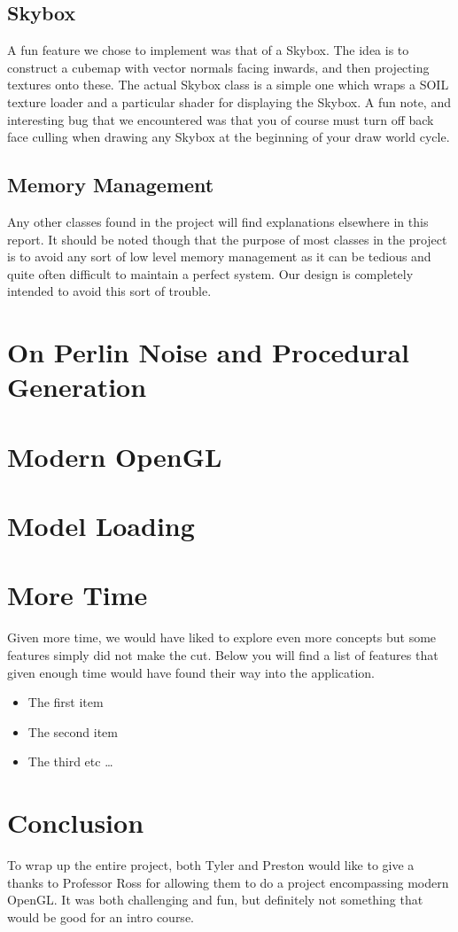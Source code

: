 \documentclass[paper=a4, fontsize=11pt]{scrartcl}
\numberwithin{equation}{section}		%
\numberwithin{figure}{section}			%
\numberwithin{table}{section}				%
\begin{document}
\subsection{Skybox}
A fun feature we chose to implement was that of a Skybox. The idea is to construct a cubemap with vector normals facing inwards, and then projecting textures onto these. The actual Skybox class is a simple one which wraps a SOIL texture loader and a particular shader for displaying the Skybox. A fun note, and interesting bug that we encountered was that you of course must turn off back face culling when drawing any Skybox at the beginning of your draw world cycle.
\subsection{Memory Management}
Any other classes found in the project will find explanations elsewhere in this report. It should be noted though that the purpose of most classes in the project is to avoid any sort of low level memory management as it can be tedious and quite often difficult to maintain a perfect system. Our design is completely intended to avoid this sort of trouble.

\section{On Perlin Noise and Procedural Generation}

\section{Modern OpenGL}

\section{Model Loading}

\section{More Time}
Given more time, we would have liked to explore even more concepts but some features simply did not make the cut. Below you will find a list of features that given enough time would have found their way into the application.
\begin{itemize}  
	\item The first item 
	\item The second item 
	\item The third etc 
	\ldots
\end{itemize}

\section{Conclusion}
To wrap up the entire project, both Tyler and Preston would like to give a thanks to Professor Ross for allowing them to do a project encompassing modern OpenGL. It was both challenging and fun, but definitely not something that would be good for an intro course.

\end{document}

